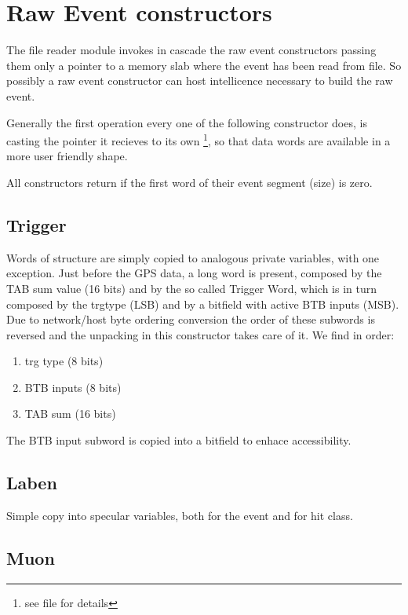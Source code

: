 \section{Raw Event constructors}

The file reader module invokes in cascade the raw event constructors passing them only a pointer to a memory slab where the event has been read from file.
So possibly a raw event constructor can host intellicence necessary to build the raw event.

Generally the first operation every one of the following constructor does, is casting the pointer it recieves to its own \footnote{see file  for details}, so that data words are available in a more user friendly shape.

All constructors return if the first word of their event segment (size) is zero.


\subsection{Trigger}
Words of  structure are simply copied to analogous private variables, with one exception.
Just before the GPS data, a long word is present, composed by the TAB sum value (16 bits) and by the so called Trigger Word, which is in turn composed by the trgtype (LSB) and by a bitfield with active BTB inputs (MSB). Due to network/host byte ordering conversion the order of these subwords is reversed and the unpacking in this constructor takes care of it.
We find in order:
\begin{enumerate}
\item trg type (8 bits)
\item BTB inputs (8 bits)
\item TAB sum (16 bits)
\end{enumerate}

The BTB input subword is copied into a bitfield to enhace accessibility.


\subsection{Laben}

Simple copy into specular variables, both for the event and for hit class.


\subsection{Muon}

